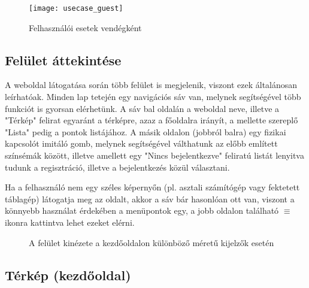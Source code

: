 \begin{figure}[H]
	\centering
	\texttt{[image: usecase\_guest]}
	\caption{Felhasználói esetek vendégként}
	\label{fig:usecase_guest}
\end{figure}

\subsection{Felület áttekintése}
\label{subsec:nav_guest}

A weboldal látogatása során több felület is megjelenik, viszont ezek általánosan leírhatóak. Minden lap tetején egy navigációs sáv van, melynek segítségével több funkciót is gyorsan elérhetünk. A sáv bal oldalán a weboldal neve, illetve a "Térkép" felirat egyaránt a térképre, azaz a főoldalra irányít, a mellette szereplő "Lista" pedig a pontok listájához. A másik oldalon (jobbról balra) egy fizikai kapcsolót imitáló gomb, melynek segítségével válthatunk az előbb említett színsémák között, illetve amellett egy "Nincs bejelentkezve" feliratú listát lenyitva tudunk a regisztráció, illetve a bejelentkezés közül választani.\par
Ha a felhasználó nem egy széles képernyőn (pl. asztali számítógép vagy fektetett táblagép) látogatja meg az oldalt, akkor a sáv bár hasonlóan ott van, viszont a könnyebb használat érdekében a menüpontok egy, a jobb oldalon található \hspace{0.1cm}\boldmath\(\equiv\)\hspace{0.1cm} ikonra kattintva lehet ezeket elérni.

\begin{figure}[H]
	\centering
	\hspace{5pt}
		\hspace{5pt}
	\caption{A felület kinézete a kezdőoldalon különböző méretű kijelzők esetén}
	\label{fig:map_guest}
\end{figure}

\subsection{Térkép (kezdőoldal)}

